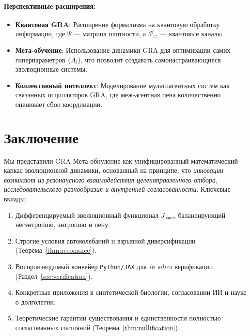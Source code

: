\documentclass[11pt,a4paper]{article}
\theoremstyle{plain}
\theoremstyle{definition}
\theoremstyle{remark}
\newcommand{\Projector}{\mathcal{P}}
\begin{document}
\paragraph{Перспективные расширения:}
\begin{itemize}
    \item \textbf{Квантовая GRA}: Расширение формализма на квантовую обработку информации, где $\Psi$ --- матрица плотности, а $\Projector_G$ --- квантовые каналы.
    \item \textbf{Мета-обучение}: Использование динамики GRA для оптимизации самих гиперпараметров $\{\Lambda_l\}$, что позволит создавать самонастраивающиеся эволюционные системы.
    \item \textbf{Коллективный интеллект}: Моделирование мультиагентных систем как связанных осцилляторов GRA, где меж-агентная пена количественно оценивает сбои координации.
\end{itemize}

\section{Заключение}

Мы представили GRA Мета-обнуление как унифицированный математический каркас эволюционной динамики, основанный на принципе, что \textit{инновации возникают из резонансного взаимодействия целенаправленного отбора, исследовательского разнообразия и внутренней согласованности}. Ключевые вклады:

\begin{enumerate}
    \item Дифференцируемый эволюционный функционал $J_{\text{эвол}}$, балансирующий негэнтропию, энтропию и пену.
    \item Строгие условия автоколебаний и взрывной диверсификации (Теорема~\ref{thm:resonance}).
    \item Воспроизводимый конвейер \texttt{Python/JAX} для \textit{in silico} верификации (Раздел~\ref{sec:verification}).
    \item Конкретные приложения в синтетической биологии, согласовании ИИ и науке о долголетии.
    \item Теоретические гарантии существования и единственности полностью согласованных состояний (Теорема~\ref{thm:nullification}).
\end{enumerate}
\end{document}
